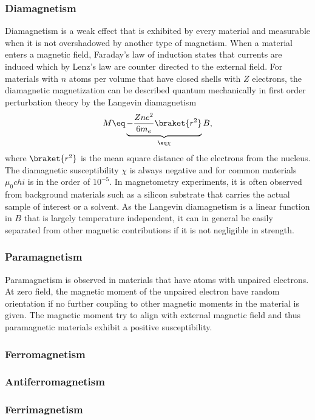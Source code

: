 \documentclass[\main/dresen_thesis.tex]{subfiles}
\begin{document}
  \subsubsection{Diamagnetism}
    Diamagnetism is a weak effect that is exhibited by every material and measurable when it is not overshadowed by another type of magnetism.
    When a material enters a magnetic field, Faraday's law of induction states that currents are induced which by Lenz's law are counter directed to the external field.
    For materials with $n$ atoms per volume that have closed shells with $Z$ electrons, the diamagnetic magnetization can be described quantum mechanically in first order perturbation theory by the Langevin diamagnetism \cite{Blundell_2001_Magne}
    \begin{align}
      M \eq \underbrace{- \frac{Z n e^2}{6 m_e} \braket{r^2}}_{\eq \chi} B,
    \end{align}
    where $\braket{r^2}$ is the mean square distance of the electrons from the nucleus.
    The diamagnetic susceptibility $\chi$ is always negative and for common materials $\mu_0 chi$ is in the order of $10^{-5}$.
    In magnetometry experiments, it is often observed from background materials such as a silicon substrate that carries the actual sample of interest or a solvent.
    As the Langevin diamagnetism is a linear function in $B$ that is largely temperature independent, it can in general be easily separated from other magnetic contributions if it is not negligible in strength.

  \subsubsection{Paramagnetism}
    Paramagnetism is observed in materials that have atoms with unpaired electrons.
    At zero field, the magnetic moment of the unpaired electron have random orientation if no further coupling to other magnetic moments in the material is given.
    The magnetic moment try to align with external magnetic field and thus paramagnetic materials exhibit a positive susceptibility.

  \subsubsection{Ferromagnetism}
  \subsubsection{Antiferromagnetism}
  \subsubsection{Ferrimagnetism}
\end{document}
